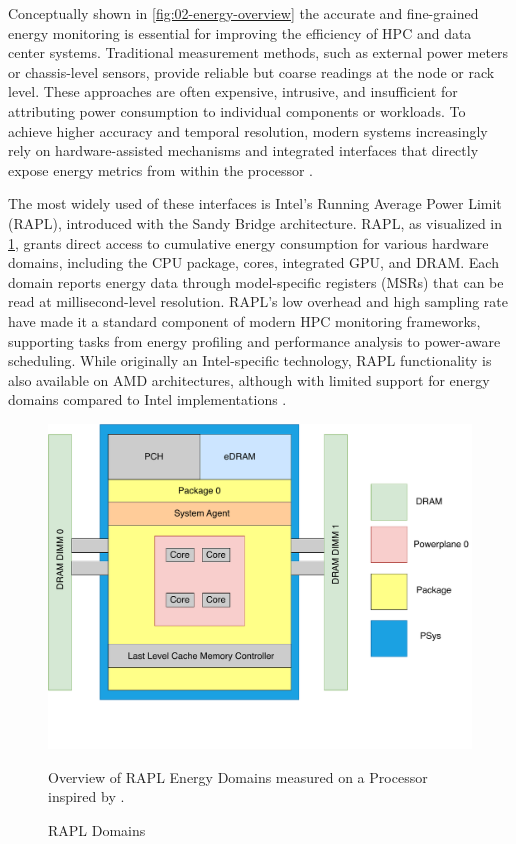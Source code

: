 Conceptually shown in \ref{fig:02-energy-overview} the accurate and fine-grained energy monitoring is essential for improving the efficiency of HPC and data center systems. Traditional measurement methods, such as external power meters or chassis-level sensors, provide reliable but coarse readings at the node or rack level. These approaches are often expensive, intrusive, and insufficient for attributing power consumption to individual components or workloads. To achieve higher accuracy and temporal resolution, modern systems increasingly rely on hardware-assisted mechanisms and integrated interfaces that directly expose energy metrics from within the processor \cite{khan2018energy}.

The most widely used of these interfaces is Intel's Running Average Power Limit (RAPL), introduced with the Sandy Bridge architecture. RAPL, as visualized in \ref{fig:02-rapl}, grants direct access to cumulative energy consumption for various hardware domains, including the CPU package, cores, integrated GPU, and DRAM. Each domain reports energy data through model-specific registers (MSRs) that can be read at millisecond-level resolution. RAPL's low overhead and high sampling rate have made it a standard component of modern HPC monitoring frameworks, supporting tasks from energy profiling and performance analysis to power-aware scheduling. While originally an Intel-specific technology, RAPL functionality is also available on AMD architectures, although with limited support for energy domains compared to Intel implementations \cite{khan2018energy}.

\begin{figure}[H]
    \centering
    \includegraphics[scale=0.4]{fig/02/02-rapl.pdf}
    \small
    \caption{RAPL Domains}
    \label{fig:02-rapl}
    \tiny
    Overview of RAPL Energy Domains measured on a Processor inspired by \cite{khan2018energy}.
\end{figure}

